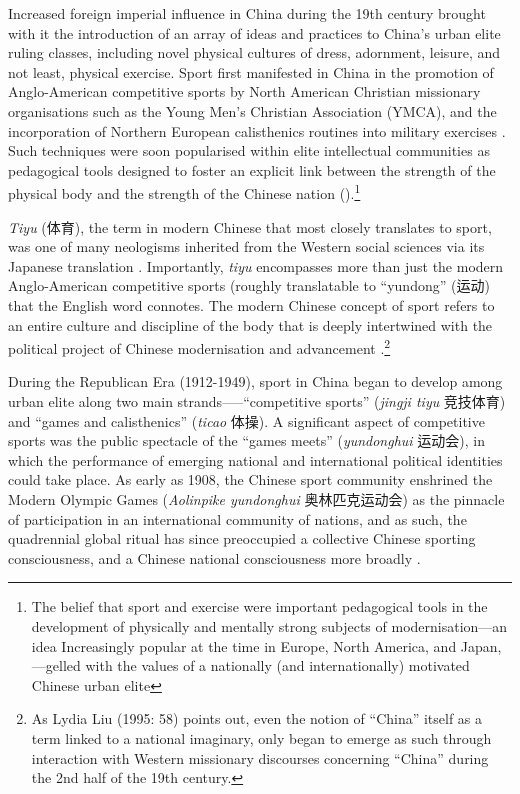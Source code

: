 \begin{CJK}{UTF8}{gbsn}
 Increased foreign imperial influence in China during the 19th century brought with it the introduction of an array of ideas and practices to China's urban elite ruling classes, including novel physical cultures of dress, adornment, leisure, and not least, physical exercise.  Sport first manifested in China in the promotion of Anglo-American competitive sports by North American Christian missionary organisations such as the Young Men's Christian Association (YMCA), and the incorporation of Northern European calisthenics routines into military exercises \citep[240]{Morris2004}.  Such techniques were soon popularised within elite intellectual communities as pedagogical tools designed to foster an explicit link between the strength of the physical body and the strength of the Chinese nation (\cites[32]{Morris2004}[49]{Brownell1995}).\footnote{The belief that sport and exercise were important pedagogical tools in the development of physically and mentally strong subjects of modernisation---an idea Increasingly popular at the time in Europe, North America, and Japan, \citep{Elias1986}---gelled with the values of a nationally (and internationally) motivated Chinese urban elite}

 \textit{Tiyu} (体育), the term in modern Chinese that most closely translates to sport, was one of many neologisms inherited from the Western social sciences via its Japanese translation \citep{Morris1998}.  Importantly, \textit{tiyu} encompasses more than just the modern Anglo-American competitive sports (roughly translatable to ``yundong'' (运动) that the English word connotes.  The modern Chinese concept of sport refers to an entire culture and discipline of the body that is deeply intertwined with the political project of Chinese modernisation and advancement \citep{Morris2004}.\footnote{As Lydia Liu (1995: 58) points out, even the notion of ``China'' itself as a term linked to a national imaginary, only began to emerge as such through interaction with Western missionary discourses concerning ``China'' during the 2nd half of the 19th century.}

 During the Republican Era (1912-1949), sport in China began to develop among urban elite along two main strands—--``competitive sports'' (\textit{jingji tiyu} 竞技体育) and ``games and calisthenics'' (\textit{ticao} 体操).  A significant aspect of competitive sports was the public spectacle of the ``games meets'' (\textit{yundonghui} 运动会), in which the performance of emerging national and international political identities could take place.  As early as 1908, the Chinese sport community enshrined the Modern Olympic Games (\textit{Aolinpike yundonghui} 奥林匹克运动会) as the pinnacle of participation in an international community of nations, and as such, the quadrennial global ritual has since preoccupied a collective Chinese sporting consciousness, and a Chinese national consciousness more broadly \citep{Jarvie2008,Barme2009,Brownell2008,Morris2004}.


\end{CJK}
